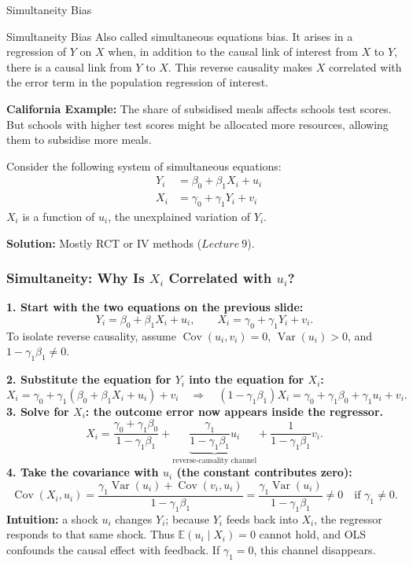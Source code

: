 \documentclass[notes,10pt, aspectratio=169]{beamer}
\begin{document}
\begin{frame}{Simultaneity Bias}
\begin{block}{Simultaneity Bias}
Also called simultaneous equations bias. It arises in a regression of $Y$ on $X$ when, in addition to the causal link of interest from $X$ to $Y$, there is a causal link from $Y$ to $X$. This reverse causality makes $X$ correlated with the error term in the population regression of interest.
\end{block}
\vspace{1em}
\textbf{California Example:} The share of subsidised meals affects schools test scores. But schools with higher test scores might be allocated more resources, allowing them to subsidise more meals.

\vspace{1em}

Consider the following system of simultaneous equations:
\begin{eqnarray*}
    &Y_i &= \beta_0 + \beta_1 X_i + u_i\\
    &X_i &= \gamma_0 + \gamma_1 Y_i + v_i
\end{eqnarray*}
$X_i$ is a function of $u_i$, the unexplained variation of $Y_i$.

\vspace{1em}

\textbf{Solution:} Mostly RCT or IV methods ($Lecture~9$).
\end{frame}


\begin{frame}
\frametitle{Simultaneity: Why Is $X_i$ Correlated with $u_i$?}
\small
\setlength{\abovedisplayskip}{4pt}
\setlength{\belowdisplayskip}{4pt}
\textbf{1. Start with the two equations on the previous slide:}
\[
Y_i=\beta_0+\beta_1X_i+u_i,
\qquad X_i=\gamma_0+\gamma_1Y_i+v_i.
\]
To isolate reverse causality, assume $\operatorname{Cov}(u_i,v_i)=0$, $\operatorname{Var}(u_i)>0$, and $1-\gamma_1\beta_1\neq0$.
\medskip

\textbf{2. Substitute the equation for $Y_i$ into the equation for $X_i$:}
\[
X_i=\gamma_0+\gamma_1(\beta_0+\beta_1X_i+u_i)+v_i
\quad\Rightarrow\quad
(1-\gamma_1\beta_1)X_i=\gamma_0+\gamma_1\beta_0+\gamma_1u_i+v_i.
\]
\textbf{3. Solve for $X_i$: the outcome error now appears inside the regressor.}
\[
X_i=\frac{\gamma_0+\gamma_1\beta_0}{1-\gamma_1\beta_1}
+\underbrace{\frac{\gamma_1}{1-\gamma_1\beta_1}u_i}_{\text{reverse-causality channel}}
+\frac{1}{1-\gamma_1\beta_1}v_i.
\]
\textbf{4. Take the covariance with $u_i$ (the constant contributes zero):}
\[
\operatorname{Cov}(X_i,u_i)
=\frac{\gamma_1\operatorname{Var}(u_i)+\operatorname{Cov}(v_i,u_i)}{1-\gamma_1\beta_1}
=\boxed{\frac{\gamma_1\operatorname{Var}(u_i)}{1-\gamma_1\beta_1}\neq0\quad\text{if }\gamma_1\neq0.}
\]
\textbf{Intuition:} a shock $u_i$ changes $Y_i$; because $Y_i$ feeds back into $X_i$, the regressor responds to that same shock. Thus $\mathbb{E}(u_i\mid X_i)=0$ cannot hold, and OLS confounds the causal effect with feedback. If $\gamma_1=0$, this channel disappears.
\end{frame}
\end{document}
